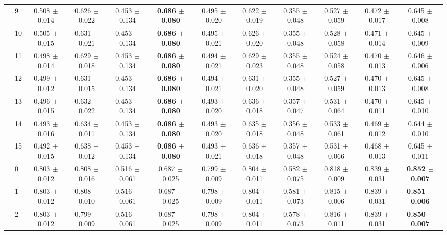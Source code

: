\begin{table*}[t]
{\begin{tabular}{%
  ll
  @{\quad}
  c@{\hskip 4pt}c
  @{\quad\quad}
  c@{\hskip 4pt}c
  @{\quad\quad}
  c@{\hskip 4pt}c
  @{\quad\quad}
  c@{\hskip 4pt}c
  @{\quad\quad}
  c@{\hskip 4pt}c
}
        & 9 & 0.508 $\pm$ 0.014 & 0.626 $\pm$ 0.022 & 0.453 $\pm$ 0.134 & \textbf{0.686 $\pm$ 0.080} & 0.495 $\pm$ 0.020 & 0.622 $\pm$ 0.019 & 0.355 $\pm$ 0.048 & 0.527 $\pm$ 0.059 & 0.472 $\pm$ 0.017 & 0.645 $\pm$ 0.008 \\
        & 10 & 0.505 $\pm$ 0.015 & 0.631 $\pm$ 0.021 & 0.453 $\pm$ 0.134 & \textbf{0.686 $\pm$ 0.080} & 0.495 $\pm$ 0.021 & 0.626 $\pm$ 0.020 & 0.355 $\pm$ 0.048 & 0.528 $\pm$ 0.058 & 0.471 $\pm$ 0.014 & 0.645 $\pm$ 0.009 \\
        & 11 & 0.498 $\pm$ 0.014 & 0.629 $\pm$ 0.018 & 0.453 $\pm$ 0.134 & \textbf{0.686 $\pm$ 0.080} & 0.494 $\pm$ 0.021 & 0.629 $\pm$ 0.023 & 0.355 $\pm$ 0.048 & 0.524 $\pm$ 0.058 & 0.470 $\pm$ 0.013 & 0.646 $\pm$ 0.006 \\
        & 12 & 0.499 $\pm$ 0.012 & 0.631 $\pm$ 0.015 & 0.453 $\pm$ 0.134 & \textbf{0.686 $\pm$ 0.080} & 0.494 $\pm$ 0.021 & 0.631 $\pm$ 0.020 & 0.355 $\pm$ 0.048 & 0.527 $\pm$ 0.059 & 0.470 $\pm$ 0.013 & 0.645 $\pm$ 0.008 \\
        & 13 & 0.496 $\pm$ 0.015 & 0.632 $\pm$ 0.022 & 0.453 $\pm$ 0.134 & \textbf{0.686 $\pm$ 0.080} & 0.493 $\pm$ 0.020 & 0.636 $\pm$ 0.018 & 0.357 $\pm$ 0.047 & 0.531 $\pm$ 0.064 & 0.470 $\pm$ 0.011 & 0.645 $\pm$ 0.010 \\
        & 14 & 0.493 $\pm$ 0.016 & 0.634 $\pm$ 0.011 & 0.453 $\pm$ 0.134 & \textbf{0.686 $\pm$ 0.080} & 0.493 $\pm$ 0.020 & 0.635 $\pm$ 0.018 & 0.356 $\pm$ 0.048 & 0.533 $\pm$ 0.061 & 0.469 $\pm$ 0.012 & 0.644 $\pm$ 0.010 \\
        & 15 & 0.492 $\pm$ 0.015 & 0.638 $\pm$ 0.012 & 0.453 $\pm$ 0.134 & \textbf{0.686 $\pm$ 0.080} & 0.493 $\pm$ 0.021 & 0.636 $\pm$ 0.018 & 0.357 $\pm$ 0.048 & 0.531 $\pm$ 0.066 & 0.468 $\pm$ 0.013 & 0.645 $\pm$ 0.011 \\
\midrule
\assist{} & 0 & 0.803 $\pm$ 0.012 & 0.808 $\pm$ 0.016 & 0.516 $\pm$ 0.061 & 0.687 $\pm$ 0.025 & 0.799 $\pm$ 0.009 & 0.804 $\pm$ 0.011 & 0.582 $\pm$ 0.075 & 0.818 $\pm$ 0.009 & 0.839 $\pm$ 0.031 & \textbf{0.852 $\pm$ 0.007} \\
        & 1 & 0.803 $\pm$ 0.012 & 0.808 $\pm$ 0.010 & 0.516 $\pm$ 0.061 & 0.687 $\pm$ 0.025 & 0.798 $\pm$ 0.009 & 0.804 $\pm$ 0.011 & 0.581 $\pm$ 0.073 & 0.815 $\pm$ 0.006 & 0.839 $\pm$ 0.031 & \textbf{0.851 $\pm$ 0.006} \\
        & 2 & 0.803 $\pm$ 0.012 & 0.799 $\pm$ 0.009 & 0.516 $\pm$ 0.061 & 0.687 $\pm$ 0.025 & 0.798 $\pm$ 0.009 & 0.804 $\pm$ 0.011 & 0.578 $\pm$ 0.073 & 0.816 $\pm$ 0.011 & 0.839 $\pm$ 0.031 & \textbf{0.850 $\pm$ 0.007} \\

\end{tabular}}
\end{table*}
